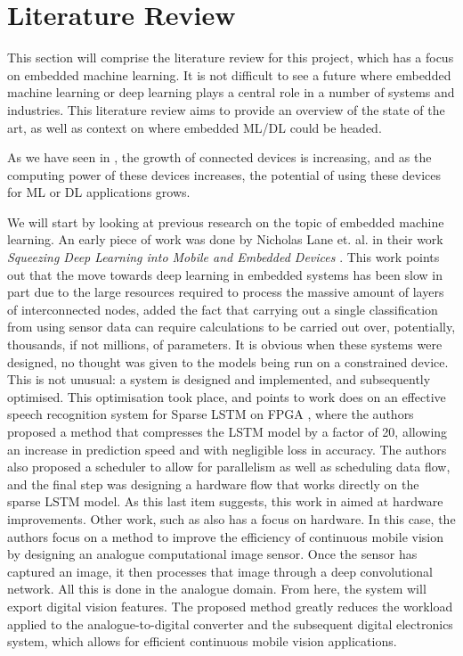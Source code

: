 \documentclass[conference]{IEEEtran}
\begin{document}
\section{Literature Review}
This section will comprise the literature review for this project, which has a focus on embedded machine learning. It is not difficult to see a future where embedded machine learning or deep learning plays a central role in a number of systems and industries. This literature review aims to provide an overview of the state of the art, as well as context on where embedded ML/DL could be headed.

As we have seen in \cite{statista1}, the growth of connected devices is increasing, and as the computing power of these devices increases, the potential of using these devices for ML or DL applications grows. 

We will start by looking at previous research on the topic of embedded machine learning. An early piece of work was done by Nicholas Lane et. al. in their work \textit{Squeezing Deep Learning into Mobile and Embedded Devices} \cite{Nicholas_Lane_2017}. This work points out that the move towards deep learning in embedded systems has been slow in part due to the large resources required to process the massive amount of layers of interconnected nodes, added the fact that carrying out a single classification from using sensor data can require calculations to be carried out over, potentially, thousands, if not millions, of parameters. It is obvious when these systems were designed, no thought was given to the models being run on a constrained device. This is not unusual: a system is designed and implemented, and subsequently optimised. This optimisation took place, and \cite{Nicholas_Lane_2017} points to work does on an effective speech recognition system for Sparse LSTM on FPGA \cite{han_s_2017}, where the authors proposed a method that compresses the LSTM model by a factor of 20, allowing an increase in prediction speed and with negligible loss in accuracy. The authors also proposed a scheduler to allow for parallelism as well as scheduling data flow, and the final step was designing a hardware flow that works directly on the sparse LSTM model. As this last item suggests, this work in aimed at hardware improvements. Other work, such as \cite{Likamwa2016} also has a focus on hardware. In this case, the authors focus on a method to improve the efficiency of continuous mobile vision by designing an analogue computational image sensor. Once the sensor has captured an image, it then processes that image through a deep convolutional network. All this is done in the analogue domain. From here, the system will export digital vision features. The proposed method greatly reduces the workload applied to the analogue-to-digital converter and the subsequent digital electronics system, which allows for efficient continuous mobile vision applications. 
\end{document}
